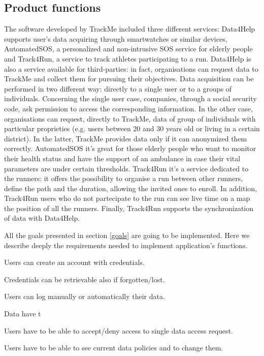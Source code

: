 \documentclass{article}
\begin{document}
\subsection{Product functions}
The software developed by TrackMe included three different services: Data4Help supports user's data acquiring through smartwatches or similar devices, AutomatedSOS, a personalized and 
non-intrusive SOS service for elderly people and Track4Run, a service to track athletes participating to a run.
Data4Help is also a service available for third-parties: in fact, organisations can request data to TrackMe and collect them for pursuing their objectives.
Data acquisition can be performed in two different way: directly to a single user or to a groups of individuals.
Concerning the single user case, companies, through a social security code, ask permission to access the corresponding information. 
In the other case, organisations can request, directly to TrackMe, data of group of individuals with particular proprieties (e.g. users between 20 and 30 years old or living in a certain district).
In the latter, TrackMe provides data only if it can anonymized them correctly.
AutomatedSOS it’s great for those elderly people who want to monitor their health status and have the support of an ambulance in case their vital parameters are under certain thresholds.
Track4Run it’s a service dedicated to the runners: it offers the possibility to organise a run between other runners, define the path and the duration, allowing the invited ones to enroll. In addition, Track4Run users who do not partecipate to the run can see live time on a map the position of all the runners. 
Finally, Track4Run supports the synchronization of data with Data4Help.

All the goals presented in section \ref{goals} are going to be implemented. Here we describe deeply the requirements needed to implement application's functions.
	
\begin{enumerate}[label={[R\arabic*]}]
    	\item Users can create an account with credentials.
    	\item Credentials can be retrievable also if forgotten/lost.
    	\item Users can log manually or automatically their data.
    	\item Data have t
    	\item Users have to be able to accept/deny access to single data access request.
    	\item Users have to be able to see current data policies and to change them.
    	\item 
\end{enumerate}
\end{document}
